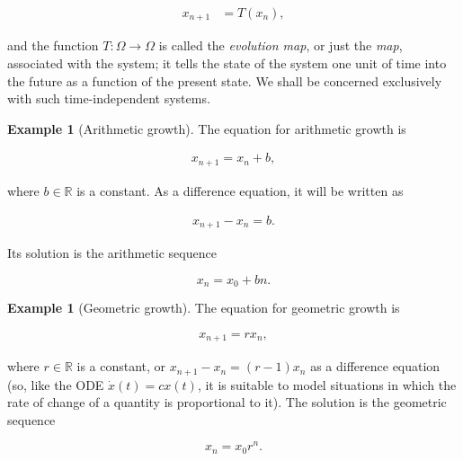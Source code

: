\documentclass[11pt]{report}
\theoremstyle{plain}
\theoremstyle{definition}
\newtheorem{example}[thm]{Example}
\begin{document}
\begin{align*}
x_{n+1} &= T(x_n),
\end{align*}

\noindent and the function $T:\Omega\to\Omega$ is called the
\emph{evolution map}, or just the \emph{map}, associated with
the system; it tells the state of the system one unit
of time into the future as a function of the present
state. We shall be concerned exclusively with such
time-independent systems.

\begin{example}[Arithmetic growth]
The equation for arithmetic growth is

\begin{align*}
x_{n+1} = x_n + b,
\end{align*}

\noindent where $b\in\mathbb{R}$ is a constant. As a difference
equation, it will be written as

\begin{align*}
x_{n+1}-x_n = b.
\end{align*}

\noindent Its solution is the arithmetic sequence

\[
x_n = x_0 + bn.
\]

\end{example}

\begin{example}[Geometric growth]
The equation for geometric growth is

\begin{align*}
x_{n+1} = r x_n ,
\end{align*}

\noindent where $r\in\mathbb{R}$ is a constant, or
$x_{n+1}-x_n = (r-1)x_n$ as a difference equation (so,
like the ODE $\dot{x}(t)=cx(t)$, it is suitable to
model situations in which the rate of change of a
quantity is proportional to it). The solution is the
geometric sequence

\[
x_n = x_0 r^n.
\]

\end{example}
\end{document}
